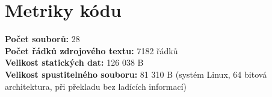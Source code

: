 \documentclass[12pt,a4paper]{article}
\begin{document}
\newpage

\section{Metriky kódu}

{\bf Počet souborů:}	28 \\
{\bf Počet řádků zdrojového textu:}	7182 řádků \\
{\bf Velikost statických dat:}	126 038 B \\
{\bf Velikost spustitelného souboru:}	81 310 B (systém Linux, 64 bitová architektura, při překladu bez ladících informací) 
\end{document}
